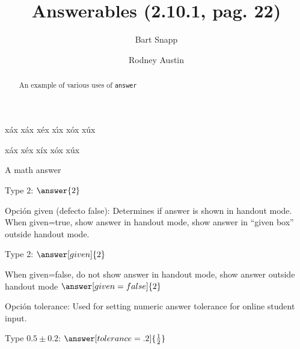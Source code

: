 \documentclass{ximera}
\title[Examples:]{Answerables (2.10.1, pag. 22)}
\author{Bart Snapp \and Rodney Austin}
\begin{document}
\begin{abstract}
  An example of various uses of \texttt{answer}
\end{abstract}
\maketitle


x\'ax x\'{a}x x\'{e}x x\'{\i}x x\'{o}x x\'{u}x

xáx xéx xíx xóx xúx

A math answer

Type $2$: $\answer{2}$

Opci{\'{o}}n  {\ttfamily given} (defecto false): Determines if answer is shown in handout mode. 
When given=true, show answer in handout mode, show answer in ``given box'' outside handout mode. 

Type 2: $\answer[given]{2}$

When given=false, do not show answer in handout mode, show answer outside handout mode  
$\answer[given=false]{2}$

Opci\'{o}n {\ttfamily tolerance}: Used for setting numeric answer tolerance for online student input.

Type $0.5\pm 0.2$: $\answer[tolerance=.2]{\frac{1}{2}}$
\end{document}
